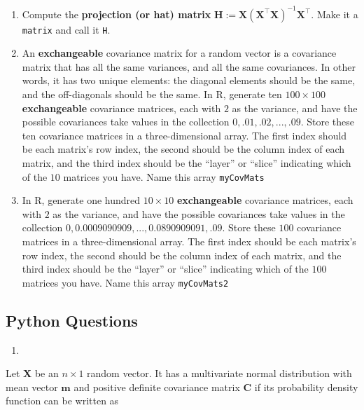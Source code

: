 \documentclass[12pt,krantz2]{krantz}
\begin{document}
\begin{enumerate}
\def\labelenumi{\alph{enumi})}
\item
  Compute the \textbf{projection (or hat) matrix} \(\mathbf{H} := \mathbf{X}\left(\mathbf{X}^\intercal \mathbf{X}\right)^{-1} \mathbf{X}^\intercal\). Make it a \texttt{matrix} and call it \texttt{H}.
\item
  An \textbf{exchangeable} covariance matrix for a random vector is a covariance matrix that has all the same variances, and all the same covariances. In other words, it has two unique elements: the diagonal elements should be the same, and the off-diagonals should be the same. In R, generate ten \(100 \times 100\) \textbf{exchangeable} covariance matrices, each with \(2\) as the variance, and have the possible covariances take values in the collection \(0,.01,.02, ..., .09.\) Store these ten covariance matrices in a three-dimensional array. The first index should be each matrix's row index, the second should be the column index of each matrix, and the third index should be the ``layer'' or ``slice'' indicating which of the \(10\) matrices you have. Name this array \texttt{myCovMats}
\item
  In R, generate one hundred \(10 \times 10\) \textbf{exchangeable} covariance matrices, each with \(2\) as the variance, and have the possible covariances take values in the collection \(0,0.0009090909, ..., 0.0890909091, .09.\) Store these \(100\) covariance matrices in a three-dimensional array. The first index should be each matrix's row index, the second should be the column index of each matrix, and the third index should be the ``layer'' or ``slice'' indicating which of the \(100\) matrices you have. Name this array \texttt{myCovMats2}
\end{enumerate}

\hypertarget{python-questions-2}{%
\subsection{Python Questions}\label{python-questions-2}}

\begin{enumerate}
\def\labelenumi{\arabic{enumi}.}
\item
\end{enumerate}

Let \(\mathbf{X}\) be an \(n \times 1\) random vector. It has a multivariate normal distribution with mean vector \(\mathbf{m}\) and positive definite covariance matrix \(\mathbf{C}\) if its probability density function can be written as
\end{document}
